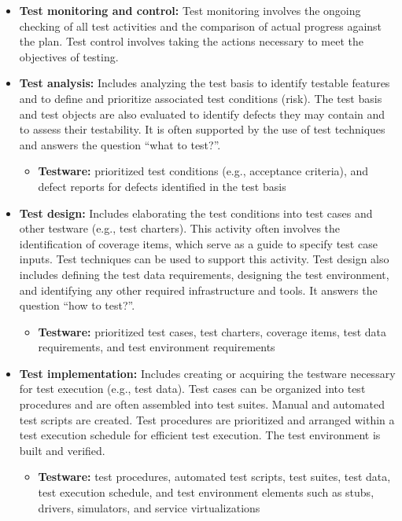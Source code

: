 \documentclass{article}
\begin{document}
\begin{multicols}{3}
{\begin{itemize}
    \item \textbf{Test monitoring and control:}
Test monitoring involves the ongoing checking of all test activities and the comparison of actual progress against the plan. Test control involves taking the actions necessary to meet the objectives of testing.
    
    \item \textbf{Test analysis:} Includes analyzing the test basis to identify testable features and to define and prioritize associated test conditions (risk). The test basis and test objects are also evaluated to identify defects they may contain and to assess their testability. It is often supported by the use of test techniques and answers the question “what to test?”.
\begin{itemize}
\item \textbf{Testware:} 
prioritized test conditions (e.g., acceptance criteria), and defect reports for defects identified in the test basis
\end{itemize}    
    
    \item \textbf{Test design:} Includes elaborating the test conditions into test cases and other testware (e.g., test charters). This activity often involves the identification of coverage items, which serve as a guide to specify test case inputs. Test techniques can be used to support this activity. Test design also includes defining the test data requirements, designing the test environment, and identifying any other required infrastructure and tools. It answers the question “how to test?”.
\begin{itemize}
\item \textbf{Testware:}
prioritized test cases, test charters, coverage items, test data requirements, and test environment requirements
\end{itemize} 
    
    \item \textbf{Test implementation:} Includes creating or acquiring the testware necessary for test execution (e.g., test data). Test cases can be organized into test procedures and are often assembled into test suites. Manual and automated test scripts are created. Test procedures are prioritized and arranged within a test execution schedule for efficient test execution. The test environment is built and verified.
\begin{itemize}
\item \textbf{Testware:}
test procedures, automated test scripts, test suites, test data, test execution schedule, and test environment elements such as stubs, drivers, simulators, and service virtualizations
\end{itemize} 
    

\end{itemize}}
\end{multicols}
\end{document}
